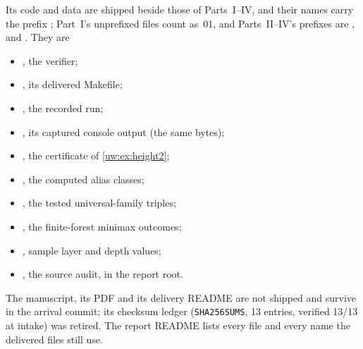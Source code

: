 \documentclass[11pt,letterpaper]{article}
\numberwithin{equation}{section}
\theoremstyle{definition}
\theoremstyle{remark}
\theoremstyle{definition}
\begin{document}
Its code and data are shipped beside those of Parts~I--IV, and their names
carry the prefix ; Part~I's unprefixed files count
as~01, and Parts~II--IV's prefixes are ,  and .
They are
\begin{itemize}
\item {}, the verifier;
\item {}, its delivered Makefile;
\item {}, the recorded run;
\item {}, its captured console
output (the same bytes);
\item {}, the certificate of
\cref{uw:ex:height2};
\item {}, the computed alias
classes;
\item {}, the tested
universal-family triples;
\item {}, the finite-forest
minimax outcomes;
\item {}, sample layer and depth
values;
\item {}, the source audit, in the report
root.
\end{itemize}
The manuscript, its PDF and its delivery README are not shipped and survive
in the arrival commit; its checksum ledger (\texttt{SHA256SUMS}, 13
entries, verified 13/13 at intake) was retired. The report README lists
every file and every name the delivered files still use.
\end{document}

